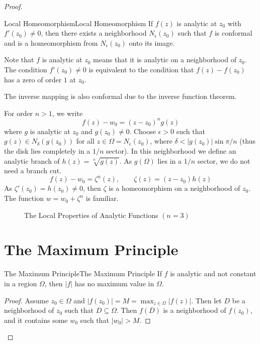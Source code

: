 \documentclass[../main.tex]{subfiles}
\begin{document}
\begin{proof}
\begin{corollary}{Local Homeomorphism}{Local Homeomorphism}
	If $f(z)$ is analytic at $z_0$ with $f'(z_0)\neq 0$, then there exists a neighborhood $N_\epsilon(z_0)$ such that $f$ is conformal and is a homeomorphism from $N_\epsilon(z_0)$ onto its image.
\end{corollary}
\begin{remark}
Note that $f$ is analytic at $z_0$ means that it is analytic on a neighborhood of $z_0$. The condition $f'(z_0)\neq 0$ is equivalent to the condition that $f(z)-f(z_0)$ has a zero of order $1$ at $z_0$.
\end{remark}

The inverse mapping is also conformal due to the inverse function theorem.

For order $n>1$, we write
\begin{equation*}
	f(z) - w_0 = (z-z_0)^n g(z)
\end{equation*}
where $g$ is analytic at $z_0$ and $g(z_0)\neq 0$. Choose $\epsilon>0$ such that $g(z)\in N_{\delta}(g(z_0))$ for all $z\in \Omega=N_{\epsilon}(z_0)$, where $\delta<\left|g(z_0)\right| \sin \pi / n$ (thus the disk lies completely in a $1 / n$ sector). In this neighborhood we define an analytic branch of $h(z) = \sqrt[n]{g(z)}$. As $g(\Omega)$ lies in a $1 / n$ sector, we do not need a branch cut.
\begin{equation*}
	f(z) - w_0 = \zeta^n(z), \qquad \zeta(z) = (z-z_0)h(z)
\end{equation*}
As $\zeta'(z_0) = h(z_0)\neq 0$, then $\zeta$ is a homeomorphism on a neighborhood of $z_0$. The function $w = w_0+\zeta^n$ is familiar.

\begin{figure}[ht]
    \centering
    \caption{The Local Properties of Analytic Functions $(n=3)$}
    \label{fig:the-local-properties-of-analytic-functions}
\end{figure}

\section{The Maximum Principle}

\begin{theorem}{The Maximum Principle}{The Maximum Principle}
If $f$ is analytic and not constant in a region $\Omega$, then $\left|f\right|$ has no maximum value in $\Omega$.
\end{theorem}
\begin{proof}
	Assume $z_0\in \Omega$ and $\left|f(z_0)\right| = M = \max_{z\in \Omega} \left|f(z)\right|$. Then let $D$ be a neighborhood of $z_0$ such that $D \subseteq \Omega$. Then $f(D)$ is a neighborhood of $f(z_0)$, and it contains some $w_0$ such that $\left|w_0\right| > M$.
\end{proof}


\end{proof}
\end{document}
